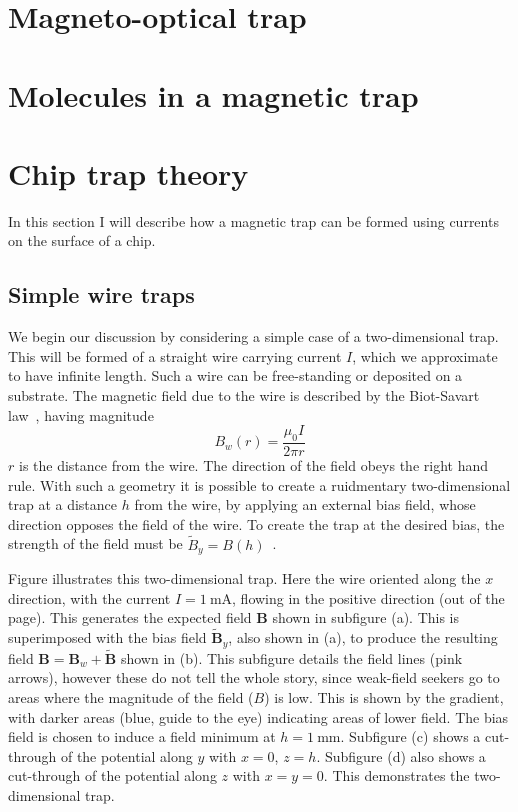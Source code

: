 
\section{Magneto-optical trap}

\section{Molecules in a magnetic trap}

\section{Chip trap theory}
\label{theory:chips}

In this section I will describe how a magnetic trap can be formed using
currents on the surface of a chip.

\subsection{Simple wire traps}

We begin our discussion by considering a simple case of a two-dimensional trap.
This will be formed of a straight wire carrying current $I$, which we
approximate to have infinite length. Such a wire can be free-standing or
deposited on a substrate.  The magnetic field due to the wire is described by
the Biot-Savart law~\cite{}, having magnitude
%
\begin{equation}
  B_w(r) = \frac{\mu_0 I}{2 \pi r}
\end{equation}
%
$r$ is the distance from the wire. The direction of the field obeys the right
hand rule. With such a geometry it is possible to create a ruidmentary
two-dimensional trap at a distance $h$ from the wire, by applying an external
bias field, whose direction opposes the field of the wire. To create the trap
at the desired bias, the strength of the field must be $\tilde{B}_y =
B(h)$~\cite{2011Ac}.

Figure  illustrates this two-dimensional trap.
Here the wire oriented along the $x$ direction, with the current
$I=\SI{1}{\milli\ampere}$, flowing in the
positive direction (out of the page). This generates the expected field
$\mathbf{B}$ shown in subfigure (a). This is superimposed with the bias field
$\mathbf{\tilde{B}}_y$, also shown in (a), to produce the resulting field
$\mathbf{B} = \mathbf{B}_w + \mathbf{\tilde{B}}$ shown
in (b). This subfigure details the field lines (pink arrows), however these do
not tell the whole story, since weak-field seekers go to areas where the
magnitude of the field ($B$) is low. This is shown by the gradient, with darker
areas (blue, guide to the eye) indicating areas of lower field. The bias field
is chosen to induce a field minimum at $h=\SI{1}{\milli\meter}$. Subfigure (c)
shows a cut-through of the potential along $y$ with $x=0$, $z=h$. Subfigure (d)
also shows a cut-through of the potential along $z$ with $x=y=0$. This
demonstrates the two-dimensional trap.

